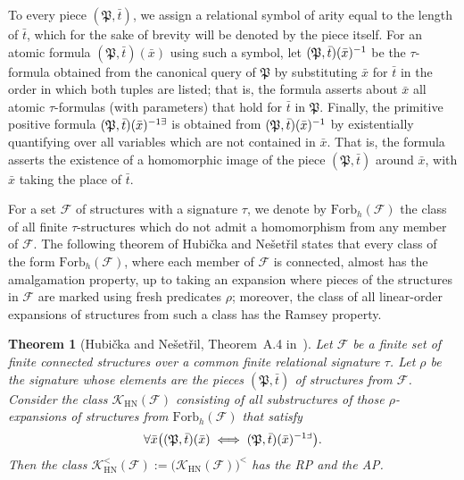 \documentclass[oneside,reqno,12pt]{amsart}
\theoremstyle{plain}
\newtheorem{theorem}[thm]{Theorem}
\theoremstyle{remark}
\newcommand{\struct}[1]{\mathfrak{#1}}
\newcommand{\pre}[1]{#1\smash{^{-1}}}
\newcommand{\prexists}[1]{#1\smash{^{-1\exists}}}
\newcommand{\Forb}{\ensuremath{\mathrm{Forb}}\xspace}
\begin{document}
{ To every piece $(\struct{P},\bar{t})$, we assign a relational symbol of arity equal to the length of $\bar t$, which for the sake of brevity will be denoted by the piece itself.   
For an atomic formula $(\struct{P},\bar{t})(\bar{x})$ using such a symbol, let $\pre{(\struct{P},\bar{t})(\bar{x})}$ be the $\tau$-formula obtained from the canonical query of $\struct{P}$ by substituting $\bar{x}$ for $\bar{t}$ in the order in which both tuples are listed; that is, the formula asserts about $\bar x$  all atomic  $\tau$-formulas (with parameters) that hold for $\bar t$ in $\struct{P}$.  
Finally, the primitive positive formula $\prexists{(\struct{P},\bar{t})(\bar{x})}$ is obtained from $\pre{(\struct{P},\bar{t})(\bar{x})}$ by existentially quantifying over all variables which are not contained in $\bar{x}$. That is, the formula asserts the existence of a homomorphic image of the piece $(\struct{P},\bar{t})$ around $\bar x$, with $\bar x$ taking the place of $\bar t$.  


 
For a set  $\mathcal{F}$ of structures with a signature $\tau$, we denote by $\Forb_{h}(\mathcal{F})$ the class of all finite $\tau$-structures which do not admit a homomorphism from any member of $\mathcal{F}$.
The following theorem of Hubi\v{c}ka and Ne\v{s}et\v{r}il states that every class of the form $\Forb_{h}(\mathcal{F})$, where each member of $\mathcal{F}$ is connected, almost has the amalgamation property, up to taking an expansion where pieces of the structures in $\mathcal{F}$ are marked using fresh predicates $\rho$; moreover, the class of all linear-order expansions of structures from such a class has the Ramsey property.

\begin{theorem}[Hubi\v{c}ka and Ne\v{s}et\v{r}il, Theorem~A.4 in~\cite{bodirsky2018_article}] \label{thm:hubicka_nesetril} Let $\mathcal{F}$ be a finite set of finite connected structures over a common finite relational signature $\tau$.
Let $\rho$ be the signature whose elements are the pieces $(\struct{P},\bar{t})$ of structures from $\mathcal{F}$.
Consider the class $\mathcal{K}_{\mathrm{HN}}(\mathcal{F})$ consisting of all substructures of those $\rho$-expansions of structures from $\Forb_{h}(\mathcal{F})$ that satisfy 
\begin{equation}
    \forall \bar{x} \big((\struct{P},\bar{t})(\bar{x})  \iff   \prexists{(\struct{P},\bar{t})(\bar{x})} \big). \label{eq:HN} 
\end{equation} 
Then the class $\mathcal{K}^{<}_{\mathrm{HN}}(\mathcal{F}):=\bigl(\mathcal{K}_{\mathrm{HN}}(\mathcal{F})\bigr)^<$  has the RP and the AP. \end{theorem}

}
\end{document}
